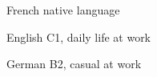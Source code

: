 

\begin{cvpairs}

  
\cvpair
    {French} %
    {native language} %


\cvpair
    {English} %
    {C1, daily life at work} %


\cvpair
    {German} %
    {B2, casual at work} %

\end{cvpairs}